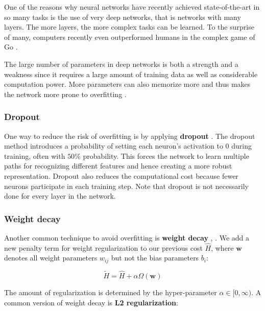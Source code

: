 One of the reasons why neural networks have recently achieved state-of-the-art in so many tasks is the use of very deep networks, that is networks with many layers.
The more layers, the more complex tasks can be learned. To the surprise of many, computers recently even outperformed humans in the complex game of Go \cite{AlphaGo, AlphaGoTuringTest}.

The large number of parameters in deep networks is both a strength and a weakness since it requires a large amount of training data as well as considerable computation power. More parameters can also memorize more and thus makes the network more prone to overfitting \cite{AlexNet}.

\subsubsection{Dropout}

One way to reduce the risk of overfitting is by applying \textbf{dropout}  \cite{AlexNet, FornesCnnCategorization}.
The dropout method introduces a probability of setting each neuron's activation to $0$ during training, often with $50\%$ probability. This forces the network to learn multiple paths for recognizing different features and hence creating a more robust representation. Dropout also reduces the computational cost because fewer neurons participate in each training step.
Note that dropout is not necessarily done for every layer in the network.


\subsubsection{Weight decay}

Another common technique to avoid overfitting is \textbf{weight decay} \cite[Chapter~3]{NielsenBook}, \cite[Chapter~7]{GoodfellowBook}. We add a new penalty term for weight regularization to our previous cost $\hat{H}$, where $\mathbf{w}$ denotes all weight parameters $w_{ij}$ but not the bias parameters $b_i$:

\[
\tilde{H} = \hat{H} + \alpha \Omega(\mathbf{w})
\]

The amount of regularization is determined by the hyper-parameter $\alpha \in [0,\infty)$.
A common version of weight decay is \textbf{L2 regularization}:

